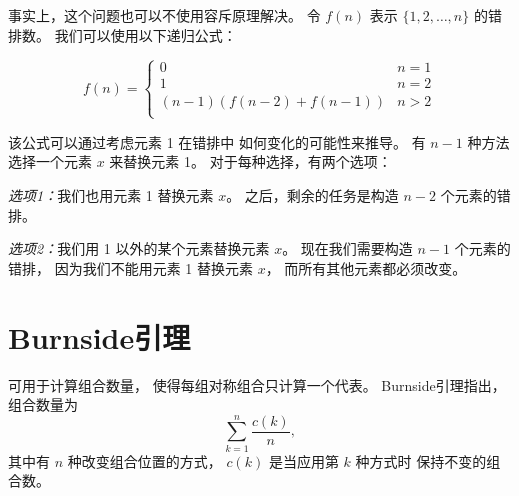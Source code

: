 事实上，这个问题也可以不使用容斥原理解决。
令 $f(n)$ 表示 $\{1,2,\ldots,n\}$ 的错排数。
我们可以使用以下递归公式：

\begin{equation*}
    f(n) = \begin{cases}
               0               & n = 1\\
               1               & n = 2\\
               (n-1)(f(n-2) + f(n-1)) & n>2 \\
           \end{cases}
\end{equation*}

该公式可以通过考虑元素 1 在错排中
如何变化的可能性来推导。
有 $n-1$ 种方法选择一个元素 $x$ 来替换元素 1。
对于每种选择，有两个选项：

\textit{选项1：}我们也用元素 1 替换元素 $x$。
之后，剩余的任务是构造 $n-2$ 个元素的错排。

\textit{选项2：}我们用 1 以外的某个元素替换元素 $x$。
现在我们需要构造 $n-1$ 个元素的错排，
因为我们不能用元素 1 替换元素 $x$，
而所有其他元素都必须改变。

\section{Burnside引理}


可用于计算组合数量，
使得每组对称组合只计算一个代表。
Burnside引理指出，组合数量为
\[\sum_{k=1}^n \frac{c(k)}{n},\]
其中有 $n$ 种改变组合位置的方式，
$c(k)$ 是当应用第 $k$ 种方式时
保持不变的组合数。

